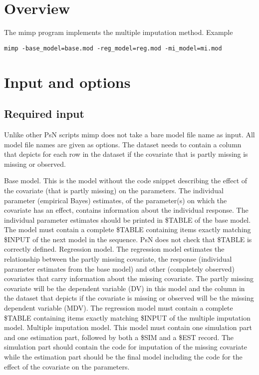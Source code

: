 



\maketitle


\section{Overview}
The mimp program implements the multiple imputation method\cite{Johansson}.
Example
\begin{verbatim}
mimp -base_model=base.mod -reg_model=reg.mod -mi_model=mi.mod
\end{verbatim}

\section{Input and options}

\subsection{Required input}
Unlike other PsN scripts mimp does not take a bare model file name as input. All model file names are given as options. The dataset needs to contain a column that depicts for each row in the dataset if the covariate that is partly missing is missing or observed.

\begin{optionlist}
Base model. This is the model without the code snippet describing the effect of the covariate (that is partly missing) on the parameters. The individual parameter (empirical Bayes) estimates, of the parameter(s) on which the covariate has an effect, contains information about the individual response. The individual parameter estimates should be printed in \$TABLE of the base model. The model must contain a complete \$TABLE containing items exactly matching \$INPUT of the next model in the sequence. PsN does not check that \$TABLE is correctly defined.  
\nextopt
{}
Regression model.  The regression model estimates the relationship between the partly missing covariate, the response (individual parameter estimates from the base model) and other (completely observed) covariates that carry information about the missing covariate. The partly missing covariate will be the dependent variable (DV) in this model and the column in the dataset that depicts if the covariate is missing or observed will be the missing dependent variable (MDV). The regression model must contain a complete \$TABLE containing items exactly matching \$INPUT of the multiple imputation model. 
\nextopt
{}
Multiple imputation model. This model must contain one simulation part and one estimation part, followed by both a \$SIM and a \$EST record. The simulation part should contain the code for imputation of the missing covariate while the estimation part should be the final model including the code for the effect of the covariate on the parameters. 
\nextopt
\end{optionlist}


